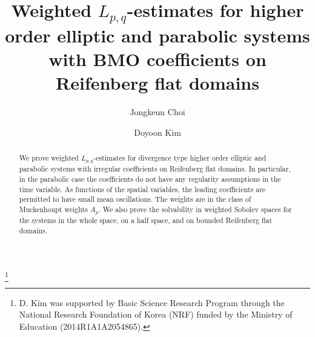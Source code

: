 \documentclass[reqno]{amsart}
\numberwithin{equation}{section}
\theoremstyle{plain}
\theoremstyle{definition}
\theoremstyle{remark}
\begin{document}
\title[$L_{p,q}$-estimates for elliptic and parabolic systems]{Weighted $L_{p,q}$-estimates for higher order elliptic and parabolic systems  with  BMO coefficients on Reifenberg flat domains}

\author[J. Choi]{Jongkeun Choi}
\address[J. Choi]{Department of Mathematics, Korea University, 145 Anam-ro, Seongbuk-gu, Seoul, 02841, Republic of Korea}

\author[D. Kim]{Doyoon Kim}
\address[D. Kim]{Department of Mathematics, Korea University, 145 Anam-ro, Seongbuk-gu, Seoul, 02841, Republic of Korea}
\thanks{D. Kim was supported by Basic Science Research Program through the National Research Foundation of Korea (NRF) funded by the Ministry of Education (2014R1A1A2054865).}


\begin{abstract}
We prove weighted $L_{p,q}$-estimates for divergence type higher order elliptic and parabolic systems with irregular coefficients on Reifenberg flat domains.
In particular, in the parabolic case the coefficients do not have any regularity assumptions in the time variable.
As functions of the spatial variables, the leading coefficients are permitted to have small mean oscillations.
The weights are in the class of Muckenhoupt weights $A_p$.
We also prove the solvability in weighted Sobolev spaces for the systems in the whole space, on a half space, and on  bounded Reifenberg flat domains.  
\end{abstract}

\maketitle
\end{document}
